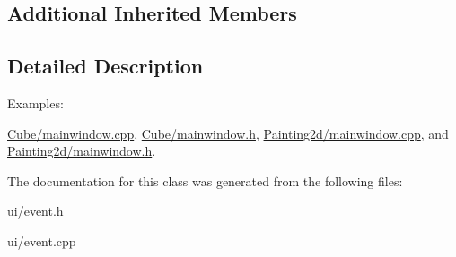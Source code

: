 \subsection*{Additional Inherited Members}


\subsection{Detailed Description}
\begin{Desc}
\item[Examples\+: ]\par
\hyperlink{_cube_2mainwindow_8cpp-example}{Cube/mainwindow.\+cpp}, \hyperlink{_cube_2mainwindow_8h-example}{Cube/mainwindow.\+h}, \hyperlink{_painting2d_2mainwindow_8cpp-example}{Painting2d/mainwindow.\+cpp}, and \hyperlink{_painting2d_2mainwindow_8h-example}{Painting2d/mainwindow.\+h}.\end{Desc}


The documentation for this class was generated from the following files\+:\begin{DoxyCompactItemize}
\item 
ui/event.\+h\item 
ui/event.\+cpp\end{DoxyCompactItemize}
